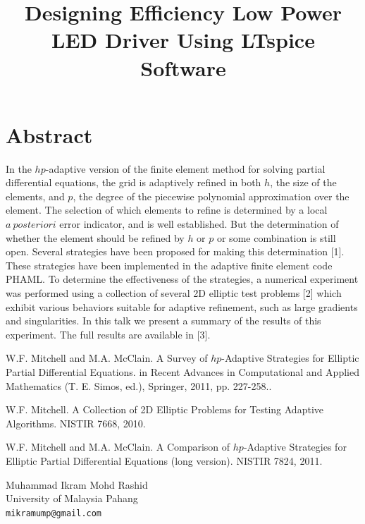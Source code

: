 \documentclass[article,A4,11pt]{llncs}%
\begin{document}
\section*{Abstract}
In the $hp$-adaptive version of the finite element method for solving partial differential equations, the grid is adaptively refined in both $h$, the size of the elements, and $p$, the degree of the piecewise polynomial approximation over the element.  The selection of which elements to refine is determined by a local $a~posteriori$ error indicator, and is well established.  But the determination of whether the element should be refined by $h$ or $p$ or some combination is still open.  Several strategies have been proposed for making this determination [1].  These strategies have been implemented in the adaptive finite element code PHAML.  To determine the effectiveness of the strategies, a numerical experiment was performed using a collection of several 2D elliptic test problems [2] which exhibit various behaviors suitable for adaptive refinement, such as large gradients and singularities.  In this talk we present a summary of the results of this experiment.  The full results are available in [3].


\begin{thebibliography}{10}
{\sc W.F. Mitchell and M.A. McClain}. {A Survey of $hp$-Adaptive Strategies for Elliptic Partial Differential Equations}. in Recent Advances in Computational and Applied Mathematics (T. E. Simos, ed.), Springer, 2011, pp. 227-258..

{\sc W.F. Mitchell}. {A Collection of 2D Elliptic Problems for Testing Adaptive Algorithms}. NISTIR 7668, 2010.

{\sc W.F. Mitchell and M.A. McClain}. {A Comparison of $hp$-Adaptive Strategies for Elliptic Partial Differential Equations (long version)}. NISTIR 7824, 2011.
\end{thebibliography}

\title{Designing Efficiency Low Power LED Driver Using LTspice Software}
 \author{} \institute{}
\maketitle
\begin{center}
{\large Muhammad Ikram Mohd Rashid}\\
University of Malaysia Pahang\\
{\tt mikramump@gmail.com}
\end{center}
\end{document}
